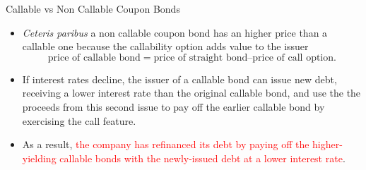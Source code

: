 \documentclass{beamer}
\begin{document}
\begin{frame}{Callable vs Non Callable Coupon Bonds}
\begin{itemize}
	\item<1-> \emph{Ceteris paribus} a non callable coupon bond has an higher price than a callable one because the callability option adds value to the issuer
	\begin{equation*}
		\text{price of callable bond} = \text{price of straight bond} – \text{price of call option}.
	\end{equation*}
	\item<2-> If interest rates decline, the issuer of a callable bond can issue new debt, receiving a lower interest rate than the original callable bond, and use the the proceeds from this second issue to pay off the earlier callable bond by exercising the call feature.
	\item<3-> As a result, \textcolor{red}{the company has refinanced its debt by paying off the higher-yielding callable bonds with the newly-issued debt at a lower interest rate}.		
\end{itemize}
\end{frame}
\end{document}
